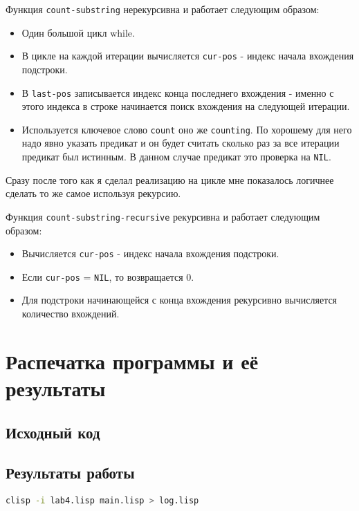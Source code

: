 \documentclass[12pt]{article}
\begin{document}
Функция {\tt count-substring} нерекурсивна и работает следующим образом:
\begin{itemize}
\setlength{\itemsep}{-1mm} %
\item Один большой цикл while.
\item В цикле на каждой итерации вычисляется {\tt cur-pos} - индекс начала вхождения подстроки.
\item В {\tt last-pos} записывается индекс конца последнего вхождения - именно с этого индекса
  в строке начинается поиск вхождения на следующей итерации.
\item Используется ключевое слово {\tt count} оно же {\tt counting}.
  По хорошему для него надо явно указать предикат и он будет считать сколько раз за все итерации
  предикат был истинным. В данном случае предикат это проверка на {\tt NIL}.
\end{itemize}

Сразу после того как я сделал реализацию на цикле мне показалось логичнее сделать то же самое используя рекурсию.

Функция {\tt count-substring-recursive} рекурсивна и работает следующим образом:
\begin{itemize}
\setlength{\itemsep}{-1mm} %
\item Вычисляется {\tt cur-pos} - индекс начала вхождения подстроки.
\item Если {\tt cur-pos} = {\tt NIL}, то возвращается 0.
\item Для подстроки начинающейся с конца вхождения рекурсивно вычисляется количество вхождений.
\end{itemize}

\section{Распечатка программы и её результаты}

\subsection{Исходный код}

\subsection{Результаты работы}
\lstinline[language=sh]{clisp -i lab4.lisp main.lisp > log.lisp}
\end{document}

